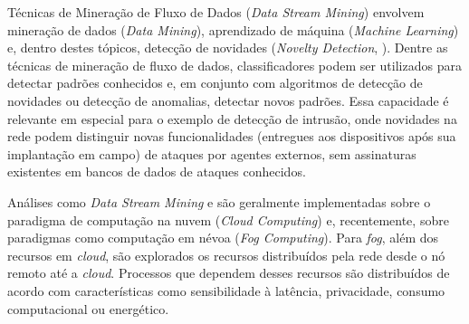 


Técnicas
de Mineração de Fluxo de Dados (\emph{Data Stream Mining}) envolvem mineração de dados
(\emph{Data Mining}), 
% 
aprendizado de máquina
(\emph{Machine Learning}) e, dentro destes tópicos, detecção de novidades
(\emph{Novelty Detection}, \nd).
Dentre as técnicas de mineração de fluxo de dados, classificadores podem ser
utilizados para detectar padrões conhecidos e, em conjunto com algoritmos de
detecção de novidades ou detecção de anomalias, detectar novos padrões.
Essa capacidade é relevante em especial para o
exemplo de detecção de intrusão, onde novidades na rede podem distinguir novas
funcionalidades (entregues aos dispositivos após sua implantação em campo) de
ataques por agentes externos, sem assinaturas existentes em bancos de
dados de ataques conhecidos.


Análises como \emph{Data Stream Mining} e \nd
são geralmente implementadas
sobre o paradigma de computação na nuvem
(\emph{Cloud Computing}) e, recentemente, sobre paradigmas
como computação em névoa
(\emph{Fog Computing}).
Para \emph{fog}, além dos recursos em \emph{cloud}, são
explorados os recursos distribuídos pela rede desde o nó remoto até a
\emph{cloud}. Processos que dependem desses recursos são distribuídos de acordo
com características como sensibilidade à latência, privacidade,
consumo computacional ou energético.

